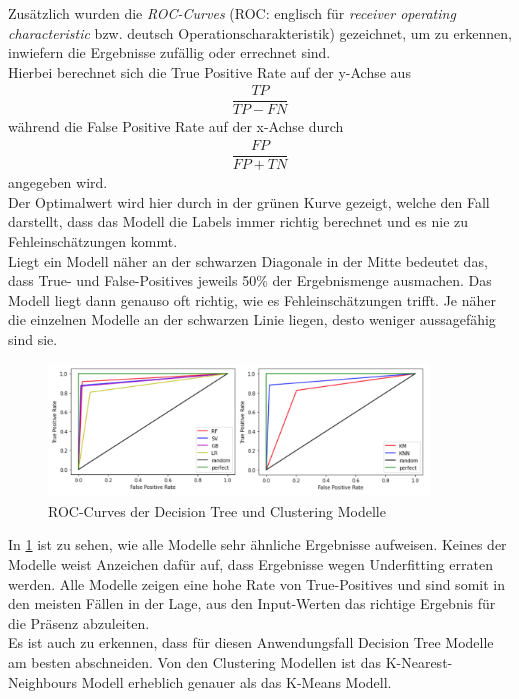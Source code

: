 \newpage
Zusätzlich wurden die \textit{ROC-Curves} (ROC: englisch für \textit{receiver operating characteristic} 
bzw. deutsch Operationscharakteristik) gezeichnet, um zu erkennen, inwiefern die Ergebnisse zufällig 
oder errechnet sind.\\
Hierbei berechnet sich die True Positive Rate auf der y-Achse aus
\begin{align}
    \dfrac{TP}{TP - FN}
\end{align}
während die False Positive Rate auf der x-Achse durch
\begin{align}
    \dfrac{FP}{FP + TN}
\end{align}
angegeben wird.\\
Der Optimalwert wird hier durch in der grünen Kurve gezeigt, welche den Fall darstellt, 
dass das Modell die Labels immer richtig berechnet und es nie zu Fehleinschätzungen kommt.\\
Liegt ein Modell näher an der schwarzen Diagonale in der Mitte bedeutet das, dass True- und 
False-Positives jeweils 50\% der Ergebnismenge ausmachen. 
Das Modell liegt dann genauso oft richtig, wie es Fehleinschätzungen trifft. 
Je näher die einzelnen Modelle an der schwarzen Linie liegen, desto weniger aussagefähig sind sie. 

\begin{figure}[!h]
    \centering
    \includegraphics[width=0.9\textwidth]{pic/roc_all.png}
    \caption{ROC-Curves der Decision Tree und Clustering Modelle}
    \label{fig:Roc_curves}
\end{figure}
In \ref{fig:Roc_curves} ist zu sehen, wie alle Modelle sehr ähnliche Ergebnisse aufweisen. Keines der Modelle weist Anzeichen 
dafür auf, dass Ergebnisse wegen Underfitting erraten werden. Alle Modelle zeigen eine hohe Rate von True-Positives und
sind somit in den meisten Fällen in der Lage, aus den Input-Werten das richtige Ergebnis für die Präsenz abzuleiten.\\
Es ist auch zu erkennen, dass für diesen Anwendungsfall Decision Tree Modelle am besten abschneiden.
Von den Clustering Modellen ist das K-Nearest-Neighbours Modell erheblich genauer als das K-Means Modell. 
\newpage

